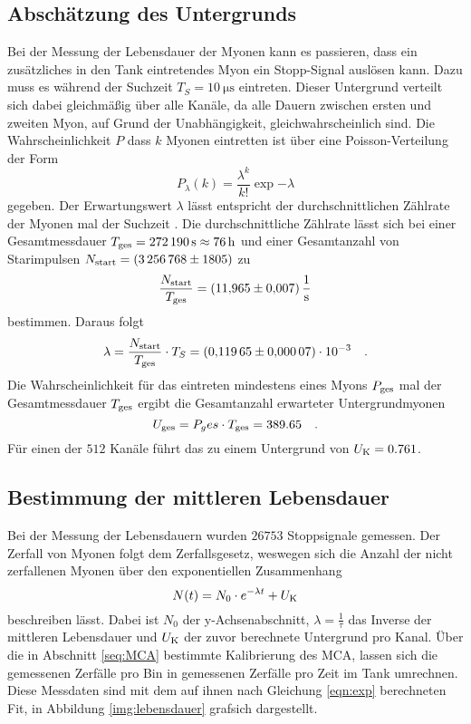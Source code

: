 \subsection{Abschätzung des Untergrunds}

\noindent
Bei der Messung der Lebensdauer der Myonen kann es passieren, dass ein zusätzliches in den Tank eintretendes Myon ein Stopp-Signal auslösen kann.
Dazu muss es während der Suchzeit $T_S = \SI{10}{\micro\second}$ eintreten. 
Dieser Untergrund verteilt sich dabei gleichmäßig über alle Kanäle, da alle Dauern zwischen ersten und zweiten Myon, auf Grund der Unabhängigkeit, gleichwahrscheinlich sind. 
Die Wahrscheinlichkeit $P$ dass $k$ Myonen eintretten ist über eine Poisson-Verteilung der Form 
\begin{equation*}
  P_{\lambda}(k)=  \frac{\lambda^k}{k!} \exp{-\lambda}
\end{equation*}
gegeben. Der Erwartungswert $\lambda$ lässt entspricht der durchschnittlichen Zählrate der Myonen mal der Suchzeit .
Die durchschnittliche Zählrate lässt sich bei einer Gesamtmessdauer $T_\t{ges} = \SI{272190}{\second} \approx \SI{76}{\hour}$ und einer Gesamtanzahl von Starimpulsen $N_\t{start} = \SI{3256768(1805)}{}$ zu
\begin{equation*}
\frac{N_\t{start}}{T_\t{ges}} = \SI{11.965(0007)}{\per\second}
\end{equation*}
bestimmen. Daraus folgt 
\begin{equation*}
  \lambda = \frac{N_\t{start}}{T_\t{ges}} \cdot T_S = \SI{0.11965 (000007)e-3}{} \quad.
\end{equation*}
Die Wahrscheinlichkeit für das eintreten mindestens eines Myons $P_\t{ges}$ mal der Gesamtmessdauer $T_\t{ges}$ ergibt die Gesamtanzahl erwarteter Untergrundmyonen
\begin{equation*}
  U_\t{ges} = P_ges \cdot T_\t{ges} = 389.65 \quad .
\end{equation*}
Für einen der $512$ Kanäle führt das zu einem Untergrund von $U_\t{K} = 0.761$.


\subsection{Bestimmung der mittleren Lebensdauer}

\noindent
Bei der Messung der Lebensdauern wurden $26753$ Stoppsignale gemessen. 
Der Zerfall von Myonen folgt dem Zerfallsgesetz, weswegen sich die Anzahl der nicht zerfallenen Myonen über den exponentiellen Zusammenhang
\begin{equation}
  N(t)=N_0\cdot e^{-\lambda t}+U_\t{K} \label{eqn:exp}
\end{equation}
beschreiben lässt. Dabei ist $N_0$ der y-Achsenabschnitt, $\lambda = \frac{1}{\tau}$ das Inverse der mittleren Lebensdauer und $U_\t{K} $ der zuvor berechnete Untergrund pro Kanal.
Über die in Abschnitt \ref{seq:MCA} bestimmte Kalibrierung des MCA, lassen sich die gemessenen Zerfälle pro Bin in gemessenen Zerfälle pro Zeit im Tank umrechnen.\\
Diese Messdaten sind mit dem auf ihnen nach Gleichung \ref{eqn:exp} berechneten Fit, in Abbildung \ref{img:lebensdauer} grafsich dargestellt.


